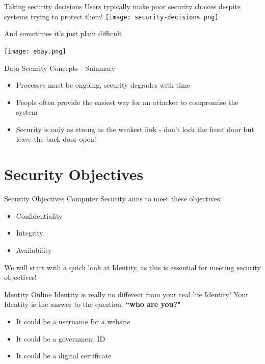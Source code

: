 \documentclass[aspectratio=169]{beamer}
\begin{document}
\begin{frame}{Taking security decisions}
Users typically make poor security choices despite systems trying to protect them!
\texttt{[image: security-decisions.png]}
\end{frame}

\begin{frame}{And sometimes it's just plain difficult}
\begin{center}
\texttt{[image: ebay.png]}
\end{center}
\end{frame}

\begin{frame}{Data Security Concepts - Summary}
\begin{itemize}
\item Processes must be ongoing, security degrades with time
\item People often provide the easiest way for an attacker to compromise the system 
\item Security is only as strong as the weakest link - don't lock the front door but leave the back door open!
\end{itemize}
\end{frame}

\section{Security Objectives}
\frame{\sectionpage}

\begin{frame}{Security Objectives}
Computer Security aims to meet these objectives: 
	\begin{itemize}
		\item Confidentiality
		\item Integrity
        \item Availability
	\end{itemize}
We will start with a quick look at Identity, as this is essential for meeting security objectives!
\end{frame}

\begin{frame}{Identity}
Online Identity is really no different from your real life Identity! 
Your Identity is the answer to the question: \textbf{``who are you?"}
\begin{itemize}
\item It could be a username for a website
\item It could be a government ID
\item It could be a digital certificate
\end{itemize}
\end{frame}
\end{document}
